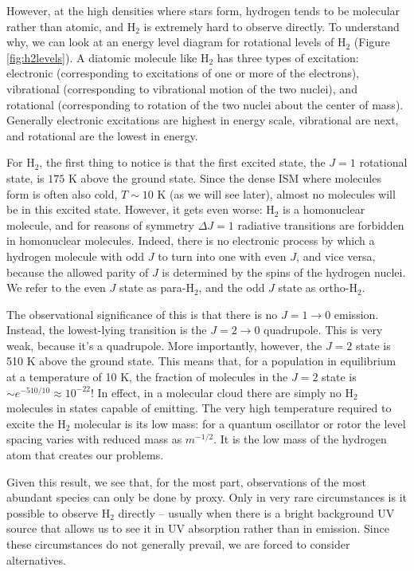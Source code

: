 However, at the high densities where stars form, hydrogen tends to be molecular rather than atomic, and H$_2$ is extremely hard to observe directly. To understand why, we can look at an energy level diagram for rotational levels of H$_2$ (Figure \ref{fig:h2levels}). A diatomic molecule like H$_2$ has three types of excitation: electronic (corresponding to excitations of one or more of the electrons), vibrational (corresponding to vibrational motion of the two nuclei), and rotational (corresponding to rotation of the two nuclei about the center of mass). Generally electronic excitations are highest in energy scale, vibrational are next, and rotational are the lowest in energy.

For H$_2$, the first thing to notice is that the first excited state, the $J=1$ rotational state, is $175$ K above the ground state. Since the dense ISM where molecules form is often also cold, $T\sim 10$ K (as we will see later), almost no molecules will be in this excited state. However, it gets even worse: H$_2$ is a homonuclear molecule, and for reasons of symmetry $\Delta J = 1$ radiative transitions are forbidden in homonuclear molecules. Indeed, there is no electronic process by which a hydrogen molecule with odd $J$ to turn into one with even $J$, and vice versa, because the allowed parity of $J$ is determined by the spins of the hydrogen nuclei. We refer to the even $J$ state as para-H$_2$, and the odd $J$ state as ortho-H$_2$.

The observational significance of this is that there is no $J=1\rightarrow 0$ emission. Instead, the lowest-lying transition is the $J=2\rightarrow 0$ quadrupole. This is very weak, because it's a quadrupole. More importantly, however, the $J=2$ state is 510 K above the ground state. This means that, for a population in equilibrium at a temperature of 10 K, the fraction of molecules in the $J=2$ state is $\sim e^{-510/10} \approx 10^{-22}$! In effect, in a molecular cloud there are simply no H$_2$ molecules in states capable of emitting. The very high temperature required to excite the H$_2$ molecular is its low mass: for a quantum oscillator or rotor the level spacing varies with reduced mass as $m^{-1/2}$. It is the low mass of the hydrogen atom that creates our problems.
  
Given this result, we see that, for the most part, observations of the most abundant species can only be done by proxy. Only in very rare circumstances is it possible to observe H$_2$ directly -- usually when there is a bright background UV source that allows us to see it in UV absorption rather than in emission. Since these circumstances do not generally prevail, we are forced to consider alternatives.

